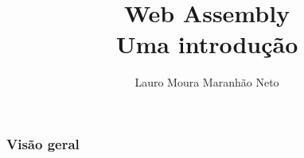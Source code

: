 \documentclass[12pt,mathserif]{beamer}
\author{Lauro Moura Maranhão Neto}
\title{Web Assembly \\ Uma introdução} %
\institute{Expertise Solutions}
\begin{document}
\begin{frame}
  \titlepage
\end{frame}


\begin{frame}
\frametitle{Visão geral}
\tableofcontents
\end{frame}


\end{document}
